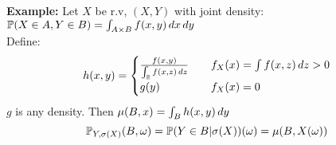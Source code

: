 \textbf{Example:} Let $X$ be r.v, $(X,Y)$ with joint density: $\mathbb{P}(X\in A, Y\in B) =\int_{A\times B} f(x,y) \mathop{}\!d x\mathop{}\!d y$ \\Define:
\begin{equation*}
    h(x,y) = \begin{cases}
    \frac{f(x,y)}{\int_{\mathbb{R}} f(x,z) \mathop{}\!d z} \quad &f_X(x) = \int f(x,z)\mathop{}\!d z >0 \\
    g(y) \quad &f_X(x) = 0
    \end{cases}
\end{equation*}
$g$ is any density. Then $\mu(B,x)= \int_B h(x,y) \mathop{}\!d y$ 
\begin{equation*}
    \mathbb{P}_{Y,\sigma(X)} (B,\omega) = \mathbb{P}(Y\in B|\sigma(X))(\omega) = \mu(B, X(\omega))
\end{equation*}




